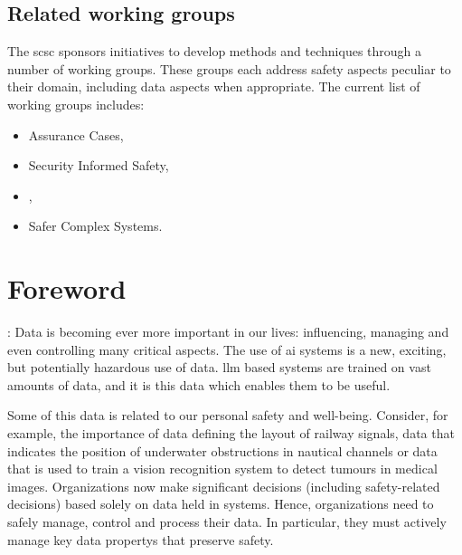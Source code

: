 \subsection*{Related working groups}
The \gls{scsc} sponsors initiatives to develop methods and techniques through a number of working groups. These groups each address safety aspects peculiar to their domain, including data aspects when appropriate. The current list of working groups includes:
%
\begin{itemize}
  \item Assurance Cases,
\item Security Informed Safety,
  \item {},
  \item Safer Complex Systems. 
\end{itemize}
%
%
\clearpage
%

\makeatletter		%
\dsiwg@intblankpage
\makeatother

\pagestyle{FirstPageFrontMatter}
\section*{Foreword}


:
Data is becoming ever more important in our lives: influencing, managing and even controlling many critical aspects.
The use of \gls{ai} systems is a new, exciting, but potentially hazardous use of data. \Gls{llm} based systems are trained on vast amounts of data, and it is this data which enables them to be useful.

Some of this data is related to our personal safety and well-being.
Consider, for example, the importance of data defining the layout of railway signals,
data that indicates the position of underwater obstructions in nautical channels or data that
is used to train a vision recognition system to detect tumours in medical images.
Organizations now make significant decisions (including safety-related decisions) based solely on data held in systems.
Hence, organizations need to safely manage, control and process their data.
In particular, they must actively manage key \glspl{data property} that preserve safety.

